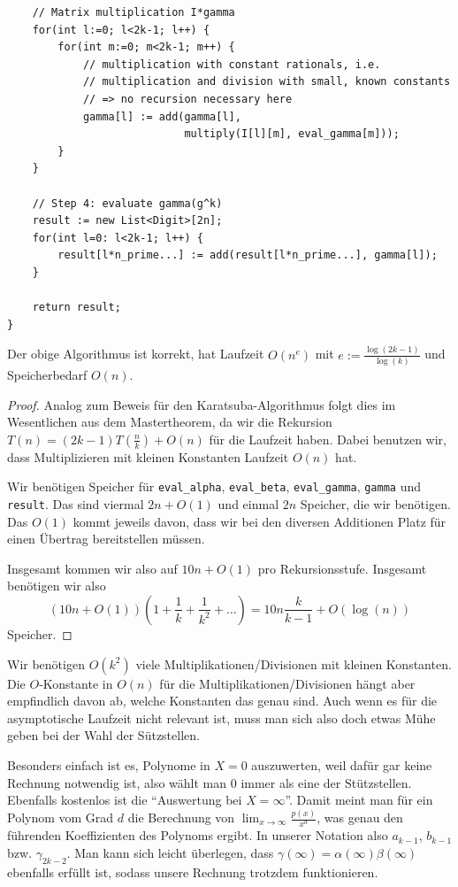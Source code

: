 \begin{algorithm}
\begin{lstlisting}
    // Matrix multiplication I*gamma
    for(int l:=0; l<2k-1; l++) {
        for(int m:=0; m<2k-1; m++) {
            // multiplication with constant rationals, i.e.
            // multiplication and division with small, known constants
            // => no recursion necessary here
            gamma[l] := add(gamma[l],
                            multiply(I[l][m], eval_gamma[m]));
        }
    }

    // Step 4: evaluate gamma(g^k)
    result := new List<Digit>[2n];
    for(int l=0: l<2k-1; l++) {
        result[l*n_prime...] := add(result[l*n_prime...], gamma[l]);
    }

    return result;
}
\end{lstlisting}
\end{algorithm}

\begin{proposition}
    Der obige Algorithmus ist korrekt, hat Laufzeit $O(n^e)$ mit $e:=\frac{\log(2k-1)}{\log(k)}$ und Speicherbedarf $O(n)$.
\end{proposition}
\begin{proof}
    Analog zum Beweis für den Karatsuba-Algorithmus folgt dies im Wesentlichen aus dem Mastertheorem, da wir die Rekursion $T(n) = (2k-1)T(\frac{n}{k})+O(n)$ für die Laufzeit haben. Dabei benutzen wir, dass Multiplizieren mit kleinen Konstanten Laufzeit $O(n)$ hat.

    Wir benötigen Speicher für \texttt{eval\_alpha}, \texttt{eval\_beta}, \texttt{eval\_gamma}, \texttt{gamma} und \texttt{result}. Das sind viermal $2n+O(1)$ und einmal $2n$ Speicher, die wir benötigen. Das $O(1)$ kommt jeweils davon, dass wir bei den diversen Additionen Platz für einen Übertrag bereitstellen müssen.

    Insgesamt kommen wir also auf $10n+O(1)$ pro Rekursionsstufe. Insgesamt benötigen wir also \[(10n+O(1))\left(1+\frac{1}{k}+\frac{1}{k^2}+\ldots\right) = 10n\frac{k}{k-1}+O(\log(n))\]
    Speicher.
\end{proof}

\begin{remark}
    Wir benötigen $O(k^2)$ viele Multiplikationen/Divisionen mit kleinen Konstanten. Die $O$-Konstante in $O(n)$ für die Multiplikationen/Divisionen hängt aber empfindlich davon ab, welche Konstanten das genau sind. Auch wenn es für die asymptotische Laufzeit nicht relevant ist, muss man sich also doch etwas Mühe geben bei der Wahl der Sützstellen.

    \smallskip
    Besonders einfach ist es, Polynome in $X=0$ auszuwerten, weil dafür gar keine Rechnung notwendig ist, also wählt man $0$ immer als eine der Stützstellen. Ebenfalls kostenlos ist die \enquote{Auswertung bei $X=\infty$}. Damit meint man für ein Polynom vom Grad $d$ die Berechnung von $\lim_{x\to\infty} \frac{p(x)}{x^d}$, was genau den führenden Koeffizienten des Polynoms ergibt. In unserer Notation also $a_{k-1}$, $b_{k-1}$ bzw. $\gamma_{2k-2}$. Man kann sich leicht überlegen, dass $\gamma(\infty)=\alpha(\infty)\beta(\infty)$ ebenfalls erfüllt ist, sodass unsere Rechnung trotzdem funktionieren.
\end{remark}

